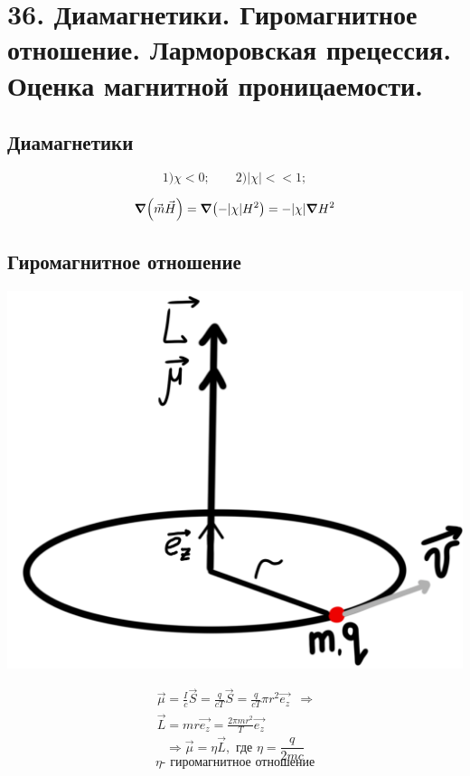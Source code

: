 \section*{36. Диамагнетики. Гиромагнитное отношение. Ларморовская прецессия.
Оценка магнитной проницаемости.}

\subsection*{Диамагнетики}

\[
1)\chi<0;\qquad2)|\chi|<<1;
\]

\[
\grad(\vec{m}\vec{H})=\grad(-|\chi|H^2)=-|\chi|\grad H^2
\]

\subsection*{Гиромагнитное отношение}

\begin{minipage}[c]{0.4\textwidth} %
    \includegraphics[width=\textwidth]{im/75.png} %
\end{minipage}%
\hfill
\begin{minipage}[c]{0.6\textwidth} %
    \[
    \begin{array}{l|l}
        \vec{\mu}= \frac{I}{c}\vec{S}=\frac{q}{cT}\vec{S}=\frac{q}{cT}\pi r^2 \vec{e_z} & \Rightarrow \\
        \vec{L}=mr\vec{e_z}=\frac{2\pi mr^2}{T}\vec{e_z} 
    \end{array}
    \]
    \[
    \Rightarrow \vec{\mu}=\eta  \vec{L}, \text{ где } \eta=\frac{q}{2mc} 
    \]
    \[
    \eta\text{- гиромагнитное отношение}
    \]
\end{minipage}

